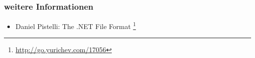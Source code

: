 \subsubsection{weitere Informationen}

\begin{itemize}
\item Daniel Pistelli: The .NET File Format \footnote{\url{http://go.yurichev.com/17056}}
\end{itemize}
